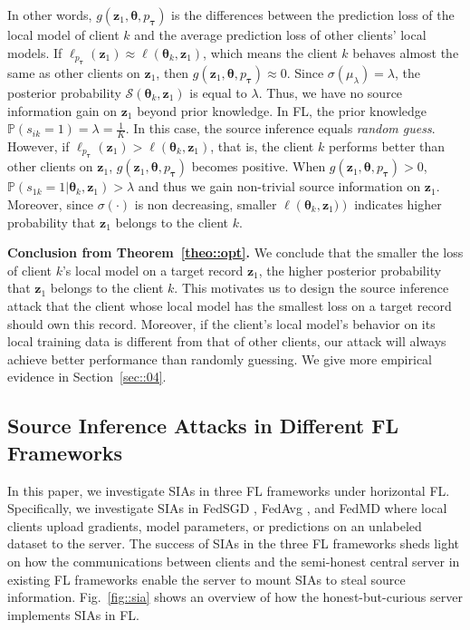 \documentclass[10pt,journal,compsoc]{IEEEtran}
\begin{document}
In other words, $g({\bm{z}_1},\bm{\theta} ,{p_{\bm{\tau}} })$ is the differences between the prediction loss of the local model of client $k$ and the average prediction loss of other clients' local models. If $\ell _{{p_{\bm{\tau}} }}({\bm{z}_1}) \approx \ell \left({\bm{\theta} _k},{\bm{z}_1}\right)$, which means the client $k$ behaves almost the same as other clients on $\bm{z}_1$, then $g({\bm{z}_1},\bm{\theta} ,{p_{\bm{\tau}} }) \approx 0$. Since $\sigma(\mu_{\lambda})=\lambda$, the posterior probability $\mathcal{S}({\bm{\theta} _k},{\bm{z}_1})$ is equal to $\lambda$. Thus, we have no source information gain on $\bm{z}_1$ beyond prior knowledge. In FL, the prior knowledge $\mathbb{P}({s}_{ik}=1)=\lambda=\frac{1}{K}$. In this case, the source inference equals \textit{random guess}. However, if $\ell _{{p_{\bm{\tau}} }}({\bm{z}_1}) > \ell \left({\bm{\theta} _k},{\bm{z}_1}\right)$, that is, the client $k$ performs better than other clients on $\bm{z}_1$, $g({\bm{z}_1},\bm{\theta} ,{p_{\bm{\tau}} })$ becomes positive. When $g({\bm{z}_1},\bm{\theta} ,{p_{\bm{\tau}} })>0$, $\mathbb{P}({{s}_{1k}} = 1|{\bm{\theta}_k},{\bm{z}_1})>\lambda$ and thus we gain non-trivial source information on $\bm{z}_1$. Moreover, since $\sigma(\cdot)$ is non decreasing, smaller $ \ell \left({\bm{\theta} _k},{\bm{z}_1})\right)$ indicates higher probability that $\bm{z}_1$ belongs to the client $k$. 

\noindent \textbf{Conclusion from Theorem~\ref{theo::opt}. \;} We conclude that the smaller the loss of client $k$'s local model on a target record $\bm{z}_1$, the higher posterior probability that $\bm{z}_1$ belongs to the client $k$. This motivates us to design the source inference attack that the client whose local model has the smallest loss on a target record should own this record. Moreover, if the client's local model's behavior on its local training data is different from that of other clients, our attack will always achieve better performance than randomly guessing. We give more empirical evidence in Section~\ref{sec::04}. 



\subsection{Source Inference Attacks in Different FL Frameworks}
In this paper, we investigate SIAs in three FL frameworks under horizontal FL. Specifically, we investigate SIAs in FedSGD \cite{mcmahan2017communication}, FedAvg \cite{mcmahan2017communication}, and FedMD \cite{li2019fedmd} where local clients upload gradients, model parameters, or predictions on an unlabeled dataset to the server. {The success of SIAs in the three FL frameworks sheds light on how the communications between clients and the semi-honest central server in existing FL frameworks enable the server to mount SIAs to steal source information.} Fig.~\ref{fig::sia} shows an overview of how the honest-but-curious server implements SIAs in FL.
\end{document}

